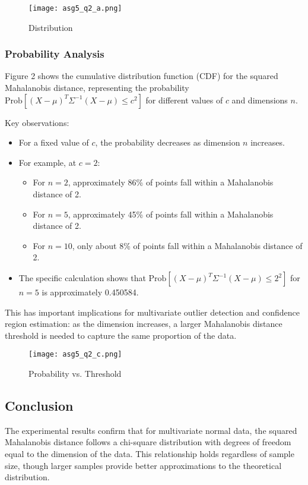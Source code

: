 \documentclass[12pt]{article}
\begin{document}
\begin{figure}[H]
    \centering
    \texttt{[image: asg5\_q2\_a.png]}
    \caption{Distribution}
    \label{fig:enter-label}
\end{figure}

\subsubsection{Probability Analysis}

Figure 2 shows the cumulative distribution function (CDF) for the squared Mahalanobis distance, representing the probability $\text{Prob}[(X - \mu)^T \Sigma^{-1} (X - \mu) \leq c^2]$ for different values of $c$ and dimensions $n$.

Key observations:
\begin{itemize}
    \item For a fixed value of $c$, the probability decreases as dimension $n$ increases.
    \item For example, at $c=2$:
    \begin{itemize}
        \item For $n=2$, approximately 86\% of points fall within a Mahalanobis distance of 2.
        \item For $n=5$, approximately 45\% of points fall within a Mahalanobis distance of 2.
        \item For $n=10$, only about 8\% of points fall within a Mahalanobis distance of 2.
    \end{itemize}
    \item The specific calculation shows that $\text{Prob}[(X - \mu)^T \Sigma^{-1} (X - \mu) \leq 2^2]$ for $n=5$ is approximately 0.450584.
\end{itemize}

This has important implications for multivariate outlier detection and confidence region estimation: as the dimension increases, a larger Mahalanobis distance threshold is needed to capture the same proportion of the data.
\begin{figure}[H]
    \centering
    \texttt{[image: asg5\_q2\_c.png]}
    \caption{Probability vs. Threshold}
    \label{fig:enter-label}
\end{figure}
\subsection{Conclusion}

The experimental results confirm that for multivariate normal data, the squared Mahalanobis distance follows a chi-square distribution with degrees of freedom equal to the dimension of the data. This relationship holds regardless of sample size, though larger samples provide better approximations to the theoretical distribution.
\end{document}
